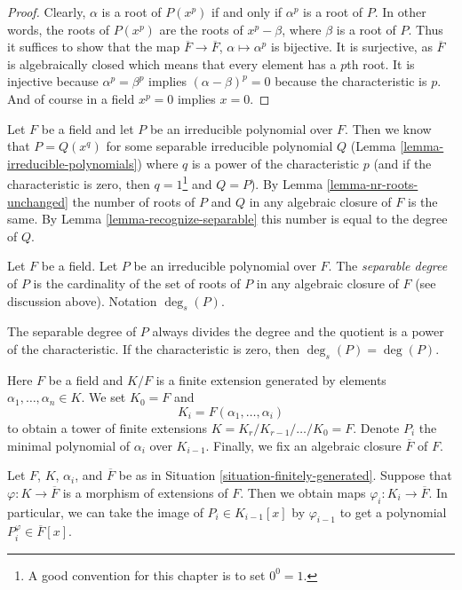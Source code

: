 \begin{proof}
Clearly, $\alpha$ is a root of $P(x^p)$ if and only if $\alpha^p$ is a
root of $P$. In other words, the roots of $P(x^p)$ are the roots of
$x^p - \beta$, where $\beta$ is a root of $P$. Thus it suffices to show
that the map $\overline{F} \to \overline{F}$, $\alpha \mapsto \alpha^p$
is bijective. It is surjective, as $\overline{F}$ is algebraically closed
which means that every element has a $p$th root. It is injective because
$\alpha^p = \beta^p$ implies $(\alpha - \beta)^p = 0$ because
the characteristic is $p$. And of course in a field $x^p = 0$ implies
$x = 0$.
\end{proof}

\noindent
Let $F$ be a field and let $P$ be an irreducible polynomial over $F$.
Then we know that $P = Q(x^q)$ for some separable irreducible polynomial $Q$
(Lemma \ref{lemma-irreducible-polynomials}) where $q$ is a power of
the characteristic $p$ (and if the characteristic is zero, then
$q = 1$\footnote{A good convention for this chapter is to set $0^0 = 1$.}
and $Q = P$). By Lemma \ref{lemma-nr-roots-unchanged} the number of
roots of $P$ and $Q$ in any algebraic closure of $F$ is the same.
By Lemma \ref{lemma-recognize-separable} this number is equal to the degree
of $Q$.

\begin{definition}
\label{definition-separable-degree}
Let $F$ be a field. Let $P$ be an irreducible polynomial over $F$.
The {\it separable degree} of $P$ is the cardinality of the
set of roots of $P$ in any algebraic closure of $F$ (see discussion
above). Notation $\deg_s(P)$.
\end{definition}

\noindent
The separable degree of $P$ always divides the degree and the quotient
is a power of the characteristic. If the characteristic is zero, then
$\deg_s(P) = \deg(P)$.

\begin{situation}
\label{situation-finitely-generated}
Here $F$ be a field and $K/F$ is a finite extension generated by elements
$\alpha_1, \ldots, \alpha_n \in K$. We set $K_0 = F$ and
$$
K_i = F(\alpha_1, \ldots, \alpha_i)
$$
to obtain a tower of finite extensions
$K = K_r / K_{r - 1} / \ldots / K_0 = F$.
Denote $P_i$ the minimal polynomial of $\alpha_i$ over $K_{i - 1}$.
Finally, we fix an algebraic closure $\overline{F}$ of $F$.
\end{situation}

\noindent
Let $F$, $K$, $\alpha_i$, and $\overline{F}$ be as in
Situation \ref{situation-finitely-generated}.
Suppose that $\varphi : K \to \overline{F}$ is a morphism of extensions
of $F$. Then we obtain maps $\varphi_i : K_i \to \overline{F}$.
In particular, we can take the image of $P_i \in K_{i - 1}[x]$ by
$\varphi_{i - 1}$ to get a polynomial $P_i^\varphi \in \overline{F}[x]$.

